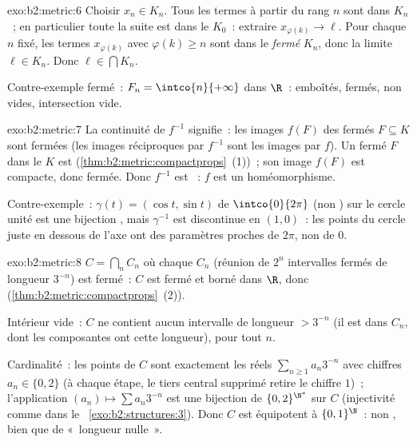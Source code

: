 \begin{solution}{exo:b2:metric:6}
Choisir $x_n \in K_n$. Tous les termes à partir du rang $n$ sont dans
$K_n$~; en particulier toute la suite est dans le  $K_0$~:
extraire $x_{\varphi(k)} \to \ell$. Pour chaque $n$ fixé, les termes
$x_{\varphi(k)}$ avec $\varphi(k) \geq n$ sont dans le \emph{fermé}
$K_n$, donc la limite $\ell \in K_n$. Donc $\ell \in \bigcap K_n$.

Contre-exemple fermé~: $F_n = \intco{n}{+\infty}$ dans $\R$~:
emboîtés, fermés, non vides, intersection vide.
\end{solution}

\begin{solution}{exo:b2:metric:7}
La continuité de $f^{-1}$ signifie~: les images $f(F)$ des fermés $F
\subseteq K$ sont fermées (les images réciproques par $f^{-1}$ sont
les images par $f$). Un fermé $F$ dans le  $K$ est 
(\cref{thm:b2:metric:compactprops}~(1))~; son image  $f(F)$
est compacte, donc fermée. Donc $f^{-1}$ est ~: $f$ est un
homéomorphisme.

Contre-exemple~: $\gamma(t) = (\cos t, \sin t)$ de $\intco{0}{2\pi}$
(non ) sur le cercle unité est une bijection , mais
$\gamma^{-1}$ est discontinue en $(1,0)$~: les points du cercle juste
en dessous de l'axe ont des paramètres proches de $2\pi$, non de $0$.
\end{solution}

\begin{solution}{exo:b2:metric:8}
$C = \bigcap_n C_n$ où chaque $C_n$ (réunion de $2^n$ intervalles
fermés de longueur $3^{-n}$) est fermé~: $C$ est fermé et borné dans
$\R$, donc  (\cref{thm:b2:metric:compactprops}~(2)).

Intérieur vide~: $C$ ne contient aucun intervalle de longueur $>
3^{-n}$ (il est dans $C_n$, dont les composantes ont cette longueur),
pour tout $n$.

Cardinalité~: les points de $C$ sont exactement les réels
$\sum_{n\geq1} a_n 3^{-n}$ avec chiffres $a_n \in \{0, 2\}$ (à chaque
étape, le tiers central supprimé retire le chiffre $1$)~;
l'application $(a_n) \mapsto \sum a_n 3^{-n}$ est une bijection de
$\{0,2\}^{\N^*}$ sur $C$ (injectivité comme dans le~%
\cref{exo:b2:structures:3}). Donc $C$ est équipotent à
$\{0,1\}^{\N}$~: non , bien que de «~longueur nulle~».
\end{solution}

